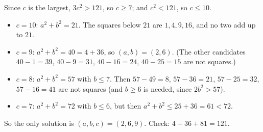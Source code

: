 Since $c$ is the largest, $3c^2>121$, so $c\ge7$; and $c^2<121$, so $c\le10$.
\begin{itemize}
\item $c=10$: $a^2+b^2=21$. The squares below $21$ are $1,4,9,16$, and no two add up to $21$.
\item $c=9$: $a^2+b^2=40=4+36$, so $(a,b)=(2,6)$. (The other candidates $40-1=39$, $40-9=31$, $40-16=24$, $40-25=15$ are not squares.)
\item $c=8$: $a^2+b^2=57$ with $b\le7$. Then $57-49=8$, $57-36=21$, $57-25=32$, $57-16=41$ are not squares (and $b\ge6$ is needed, since $2b^2>57$).
\item $c=7$: $a^2+b^2=72$ with $b\le6$, but then $a^2+b^2\le25+36=61<72$.
\end{itemize}
So the only solution is $\boxed{(a,b,c)=(2,6,9)}$. Check: $4+36+81=121$.

